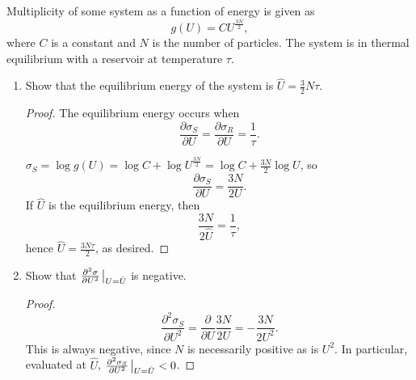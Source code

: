 \documentclass[12pt]{article}
\newenvironment{problem}[2][Problem]{\begin{trivlist}
    \item[\hskip \labelsep {\bfseries #1}\hskip \labelsep {\bfseries #2.}]}{\end{trivlist}}
\theoremstyle{definition}
\begin{document}
\begin{problem}{1}
  Multiplicity of some system as a function of energy is given as
  \begin{equation}
  \label{eq:1}
  g(U) = C U^{\frac{3N}{2}},
  \end{equation}
  where \( C \) is a constant and \( N \) is the number of particles.
  The system is in thermal equilibrium with a reservoir at temperature \(\tau\).
  \begin{enumerate}[label=(\alph*)]
    \item Show that the equilibrium energy of the system is \( \hat{U} = \frac{3}{2}N \tau\).
          \begin{proof}
            The equilibrium energy occurs when
            \begin{equation}
            \label{eq:2}
            \frac{\partial \sigma_{S}}{\partial U} = \frac{\partial \sigma_{R}}{\partial U} = \frac{1}{\tau}.
            \end{equation}

            \(\sigma_S = \log g(U) = \log C + \log U^{\frac{3N}{2}} = \log C + \frac{3N}{2}\log U\), so
            \begin{equation}
            \label{eq:3}
            \frac{\partial \sigma_{S}}{\partial U} = \frac{3N}{2U}.
            \end{equation}
            If \( \hat{U} \) is the equilibrium energy, then
            \begin{equation}
            \label{eq:4}
            \frac{3N}{2 \hat{U}} = \frac{1}{\tau},
          \end{equation}
          hence \( \hat{U} = \frac{3N\tau}{2} \), as desired.
          \end{proof}
    \item Show that \( \frac{\partial^2 \sigma}{\partial U^2} \eval_{U = \hat{U}}\) is negative.
          \begin{proof}
            \begin{equation}
            \label{eq:5}
            \frac{\partial^2 \sigma_{S}}{\partial U^2} = \frac{\partial }{\partial U} \frac{3N}{2U} = - \frac{3N}{2 U^2}.
            \end{equation}
            This is always negative, since \( N \) is necessarily positive as is \( U^2 \).
            In particular, evaluated at \( \hat{U} \), \( \frac{\partial^2 \sigma_{S}}{\partial U^2} \eval_{U = \hat{U}} < 0  \).
          \end{proof}
  \end{enumerate}
\end{problem}
\end{document}
